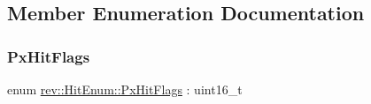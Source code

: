 \subsection{Member Enumeration Documentation}
\mbox{\label{structrev_1_1_hit_enum_a0084e22d4d5d750565239ebcde227412}} 
\subsubsection{\texorpdfstring{PxHitFlags}{PxHitFlags}}
{\footnotesize\ttfamily enum \mbox{\hyperlink{structrev_1_1_hit_enum_a0084e22d4d5d750565239ebcde227412}{rev\+::\+Hit\+Enum\+::\+Px\+Hit\+Flags}} \+: uint16\+\_\+t}

